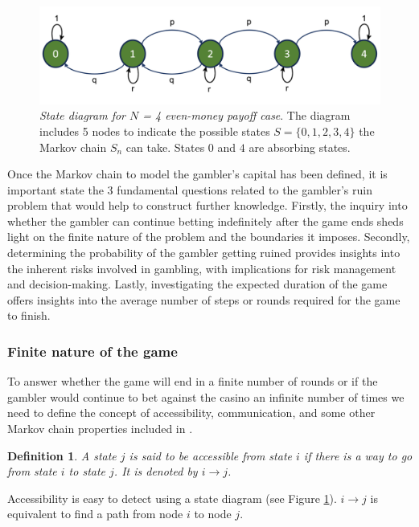 \documentclass[11pt,twoside]{article}
\newtheorem{Definition}{Definition}
\numberwithin{Theorem}{section}
\numberwithin{Definition}{section}
\numberwithin{Lemma}{section}
\numberwithin{Algorithm}{section}
\numberwithin{equation}{section}
\begin{document}
\begin{figure}[h!]
        \centering
        \includegraphics[width=12cm]{diagram.png}
        \caption[Markov chain state diagram even-money payoff case.] {\textit{State diagram for $N$ = 4 even-money payoff case}. The diagram includes 5 nodes to indicate the possible states $S = \{0,1,2,3,4\}$ the Markov chain $S_{n}$ can take. States $0$ and $4$ are absorbing states.} \label{fig:diagram}
\end{figure}
Once the Markov chain to model the gambler's capital has been defined, it is important state the 3 fundamental questions related to the gambler's ruin problem that would help to construct further knowledge. Firstly, the inquiry into whether the gambler can continue betting indefinitely after the game ends sheds light on the finite nature of the problem and the boundaries it imposes. Secondly, determining the probability of the gambler getting ruined provides insights into the inherent risks involved in gambling, with implications for risk management and decision-making. Lastly, investigating the expected duration of the game offers insights into the average number of steps or rounds required for the game to finish.

\subsubsection{Finite nature of the game}\label{finite_nature}
To answer whether the game will end in a finite number of rounds or if the gambler would continue to bet against the casino an infinite number of times we need to define the concept of accessibility, communication, and some other Markov chain properties included in \cite{kulkarni, feller}.

\begin{Definition} A state $j$ is said to be accessible from state $i$ if there is a way to go from state $i$ to state $j$. It is denoted by $i \rightarrow j$.
\end{Definition}

Accessibility is easy to detect using a state diagram (see Figure \ref{fig:diagram}). $i \rightarrow j$ is equivalent to find a   path from node $i$ to node $j$. 
\end{document}
